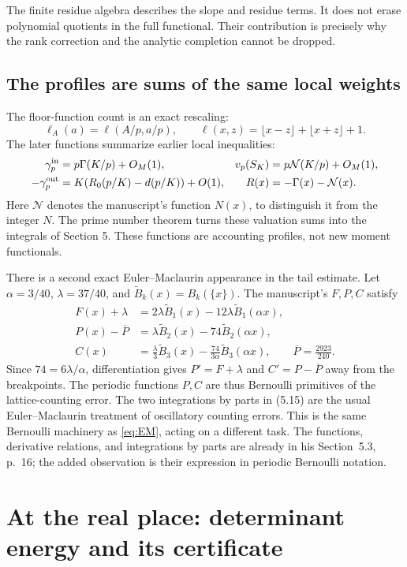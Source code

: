 \documentclass[11pt]{article}
\theoremstyle{definition}
\theoremstyle{remark}\newtheorem*{remark}{Remark}
\newcommand{\Btil}{\widetilde B}
\begin{document}
The finite residue algebra describes the slope and residue terms. It does not
erase polynomial quotients in the full functional. Their contribution is
precisely why the rank correction and the analytic completion cannot be dropped.

\subsection{The profiles are sums of the same local weights}
The floor-function count is an exact rescaling:
\[
 \ell_A(a)=\ell(A/p,a/p),\qquad
 \ell(x,z)=\lfloor x-z\rfloor+\lfloor x+z\rfloor+1.
\]
The later functions summarize earlier local inequalities:
\begin{align*}
 \gamma_p^{\rm in}&=p\Gamma(K/p)+O_M(1),&
 v_p(S_K)&=p\mathcal N(K/p)+O_M(1),\\
 -\gamma_p^{\rm out}&=K(R_0(p/K)-d(p/K))+O(1),&
 R(x)&=-\Gamma(x)-\mathcal N(x).
\end{align*}
Here $\mathcal N$ denotes the manuscript's function $N(x)$, to distinguish it
from the integer $N$. The prime number theorem turns these valuation sums
into the integrals of Section 5. These functions are accounting profiles,
not new moment functionals.

There is a second exact Euler--Maclaurin appearance in the tail estimate.
Let $\alpha=3/40$, $\lambda=37/40$, and
$\Btil_k(x)=B_k(\{x\})$. The manuscript's $F,P,C$ satisfy
\begin{align}
 F(x)+\lambda&=2\lambda\Btil_1(x)-12\lambda\Btil_1(\alpha x),\label{eq:tail1}\\
 P(x)-\overline P&=\lambda\Btil_2(x)-74\Btil_2(\alpha x),\label{eq:tail2}\\
 C(x)&=\frac\lambda3\Btil_3(x)-\frac{74}{3\alpha}\Btil_3(\alpha x),
 \qquad \overline P=\frac{2923}{240}.\label{eq:tail3}
\end{align}
Since $74=6\lambda/\alpha$, differentiation gives $P'=F+\lambda$ and
$C'=P-\overline P$ away from the breakpoints. The periodic functions $P,C$
are thus Bernoulli primitives of the lattice-counting error. The two
integrations by parts in (5.15) are the usual Euler--Maclaurin treatment of
oscillatory counting errors. This is the same Bernoulli machinery as
\eqref{eq:EM}, acting on a different task. The functions, derivative
relations, and integrations by parts are already in his Section~5.3, p.~16;
the added observation is their expression in periodic Bernoulli notation.

\section{At the real place: determinant energy and its certificate}
\end{document}
